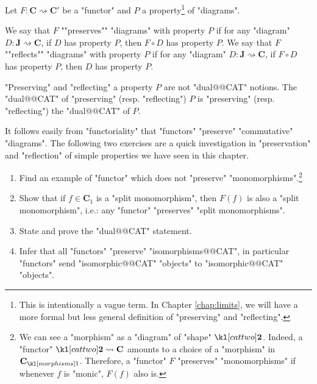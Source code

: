 \documentclass[main.tex]{subfiles}
\begin{document}
\begin{defn}
	Let $F: \mathbf{C} \rightsquigarrow \mathbf{C}'$ be a "functor" and $P$ a property\footnote{This is intentionally a vague term. In Chapter \ref{chap:limits}, we will have a more formal but less general definition of "preserving" and "reflecting".} of "diagrams".
	\begin{itemize}
		\itemAP[-] We say that $F$ ""preserves"" "diagrams" with property $P$ if for any "diagram" $D: \mathbf{J} \rightsquigarrow \mathbf{C}$, if $D$ has property $P$, then $F \circ D$ has property $P$.
		\itemAP[-] We say that $F$ ""reflects"" "diagrams" with property $P$ if for any "diagram" $D: \mathbf{J} \rightsquigarrow \mathbf{C}$, if $F \circ D$ has property $P$, then $D$ has property $P$.
	\end{itemize}
\end{defn}
\begin{warn}
	"Preserving" and "reflecting" a property $P$ are not "dual@@CAT" notions. The "dual@@CAT" of "preserving" (resp. "reflecting") $P$ is "preserving" (resp. "reflecting") the "dual@@CAT" of $P$. 
\end{warn}
It follows easily from "functoriality" that "functors" "preserve" "commutative" "diagrams". The following two exercises are a quick investigation in "preservation" and "reflection" of simple properties we have seen in this chapter.
\begin{exer}\label{exer:duality:preserving}
	\begin{enumerate}
        \item Find an example of "functor" which does not "preserve" "monomorphisms".\footnote{We can see a "morphism" as a "diagram" of "shape" $\cattwo$. Indeed, a "functor" $\cattwo \rightsquigarrow \mathbf{C}$ amounts to a choice of a "morphism" in $\mor{\mathbf{C}}$. Therefore, a "functor" $F$ "preserves" "monomorphisms" if whenever $f$ is "monic", $F(f)$ also is.}
        \item Show that if $f \in \mathbf{C}_1$ is a "split monomorphism", then $F(f)$ is also a "split monomorphism", i.e.: any "functor" "preserves" "split monomorphisms".
        \item State and prove the "dual@@CAT" statement.
        \item Infer that all "functors" "preserve" "isomorphisms@@CAT", in particular "functors" send "isomorphic@@CAT" "objects" to "isomorphic@@CAT" "objects".
    \end{enumerate}
\end{exer}
\end{document}
